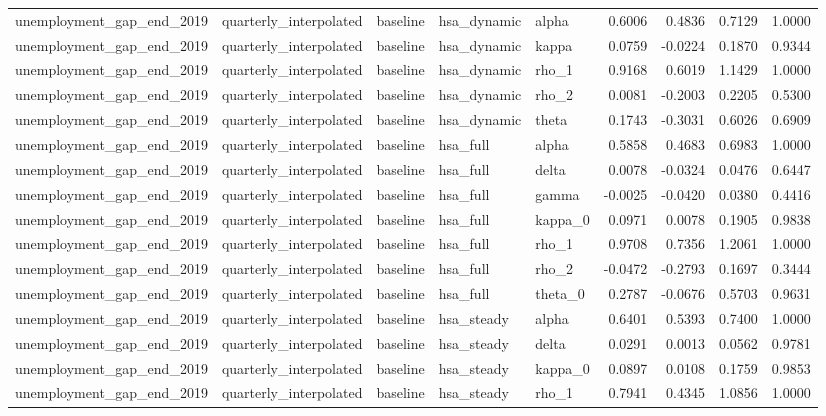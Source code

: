 \begin{tabular}{lllllrrrr}
unemployment\_gap\_end\_2019 & quarterly\_interpolated & baseline & hsa\_dynamic & alpha & 0.6006 & 0.4836 & 0.7129 & 1.0000 \\
unemployment\_gap\_end\_2019 & quarterly\_interpolated & baseline & hsa\_dynamic & kappa & 0.0759 & -0.0224 & 0.1870 & 0.9344 \\
unemployment\_gap\_end\_2019 & quarterly\_interpolated & baseline & hsa\_dynamic & rho\_1 & 0.9168 & 0.6019 & 1.1429 & 1.0000 \\
unemployment\_gap\_end\_2019 & quarterly\_interpolated & baseline & hsa\_dynamic & rho\_2 & 0.0081 & -0.2003 & 0.2205 & 0.5300 \\
unemployment\_gap\_end\_2019 & quarterly\_interpolated & baseline & hsa\_dynamic & theta & 0.1743 & -0.3031 & 0.6026 & 0.6909 \\
unemployment\_gap\_end\_2019 & quarterly\_interpolated & baseline & hsa\_full & alpha & 0.5858 & 0.4683 & 0.6983 & 1.0000 \\
unemployment\_gap\_end\_2019 & quarterly\_interpolated & baseline & hsa\_full & delta & 0.0078 & -0.0324 & 0.0476 & 0.6447 \\
unemployment\_gap\_end\_2019 & quarterly\_interpolated & baseline & hsa\_full & gamma & -0.0025 & -0.0420 & 0.0380 & 0.4416 \\
unemployment\_gap\_end\_2019 & quarterly\_interpolated & baseline & hsa\_full & kappa\_0 & 0.0971 & 0.0078 & 0.1905 & 0.9838 \\
unemployment\_gap\_end\_2019 & quarterly\_interpolated & baseline & hsa\_full & rho\_1 & 0.9708 & 0.7356 & 1.2061 & 1.0000 \\
unemployment\_gap\_end\_2019 & quarterly\_interpolated & baseline & hsa\_full & rho\_2 & -0.0472 & -0.2793 & 0.1697 & 0.3444 \\
unemployment\_gap\_end\_2019 & quarterly\_interpolated & baseline & hsa\_full & theta\_0 & 0.2787 & -0.0676 & 0.5703 & 0.9631 \\
unemployment\_gap\_end\_2019 & quarterly\_interpolated & baseline & hsa\_steady & alpha & 0.6401 & 0.5393 & 0.7400 & 1.0000 \\
unemployment\_gap\_end\_2019 & quarterly\_interpolated & baseline & hsa\_steady & delta & 0.0291 & 0.0013 & 0.0562 & 0.9781 \\
unemployment\_gap\_end\_2019 & quarterly\_interpolated & baseline & hsa\_steady & kappa\_0 & 0.0897 & 0.0108 & 0.1759 & 0.9853 \\
unemployment\_gap\_end\_2019 & quarterly\_interpolated & baseline & hsa\_steady & rho\_1 & 0.7941 & 0.4345 & 1.0856 & 1.0000 \\

\end{tabular}
